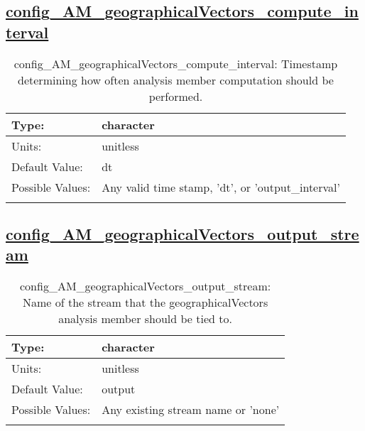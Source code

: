 \subsection[config\_AM\_geographicalVectors\_compute\_interval]{\hyperref[sec:nm_tab_AM_geographicalVectors]{config\_AM\_geographicalVectors\_compute\_interval}}
\label{subsec:nm_sec_config_AM_geographicalVectors_compute_interval}
\begin{center}
\begin{longtable}{| p{2.0in} || p{4.0in} |}
    \hline
    Type: & character \\
    \hline
    Units: & \si{unitless} \\
    \hline
    Default Value: & dt \\
    \hline
    Possible Values: & Any valid time stamp, 'dt', or 'output\_interval' \\
    \hline
    \caption{config\_AM\_geographicalVectors\_compute\_interval: Timestamp determining how often analysis member computation should be performed.}
\end{longtable}
\end{center}
\subsection[config\_AM\_geographicalVectors\_output\_stream]{\hyperref[sec:nm_tab_AM_geographicalVectors]{config\_AM\_geographicalVectors\_output\_stream}}
\label{subsec:nm_sec_config_AM_geographicalVectors_output_stream}
\begin{center}
\begin{longtable}{| p{2.0in} || p{4.0in} |}
    \hline
    Type: & character \\
    \hline
    Units: & \si{unitless} \\
    \hline
    Default Value: & output \\
    \hline
    Possible Values: & Any existing stream name or 'none' \\
    \hline
    \caption{config\_AM\_geographicalVectors\_output\_stream: Name of the stream that the geographicalVectors analysis member should be tied to.}
\end{longtable}
\end{center}
